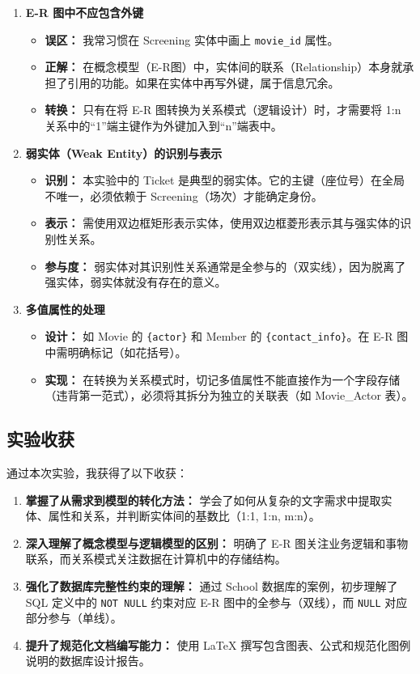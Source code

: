 \documentclass[a4paper]{article}
\begin{document}
\begin{enumerate}
    \item \textbf{E-R 图中不应包含外键}
    \begin{itemize}
        \item \textbf{误区：} 我常习惯在 Screening 实体中画上 \texttt{movie\_id} 属性。
        \item \textbf{正解：} 在概念模型（E-R图）中，实体间的联系（Relationship）本身就承担了引用的功能。如果在实体中再写外键，属于信息冗余。
        \item \textbf{转换：} 只有在将 E-R 图转换为关系模式（逻辑设计）时，才需要将 1:n 关系中的“1”端主键作为外键加入到“n”端表中。
    \end{itemize}

    \item \textbf{弱实体（Weak Entity）的识别与表示}
    \begin{itemize}
        \item \textbf{识别：} 本实验中的 Ticket 是典型的弱实体。它的主键（座位号）在全局不唯一，必须依赖于 Screening（场次）才能确定身份。
        \item \textbf{表示：} 需使用双边框矩形表示实体，使用双边框菱形表示其与强实体的识别性关系。
        \item \textbf{参与度：} 弱实体对其识别性关系通常是全参与的（双实线），因为脱离了强实体，弱实体就没有存在的意义。
    \end{itemize}

    \item \textbf{多值属性的处理}
    \begin{itemize}
        \item \textbf{设计：} 如 Movie 的 \texttt{\{actor\}} 和 Member 的 \texttt{\{contact\_info\}}。在 E-R 图中需明确标记（如花括号）。
        \item \textbf{实现：} 在转换为关系模式时，切记多值属性不能直接作为一个字段存储（违背第一范式），必须将其拆分为独立的关联表（如 Movie\_Actor 表）。
    \end{itemize}
\end{enumerate}

\subsection{实验收获}
通过本次实验，我获得了以下收获：

\begin{enumerate}
    \item \textbf{掌握了从需求到模型的转化方法：} 学会了如何从复杂的文字需求中提取实体、属性和关系，并判断实体间的基数比（1:1, 1:n, m:n）。
    \item \textbf{深入理解了概念模型与逻辑模型的区别：} 明确了 E-R 图关注业务逻辑和事物联系，而关系模式关注数据在计算机中的存储结构。
    \item \textbf{强化了数据库完整性约束的理解：} 通过 School 数据库的案例，初步理解了 SQL 定义中的 \texttt{NOT NULL} 约束对应 E-R 图中的全参与（双线），而 \texttt{NULL} 对应部分参与（单线）。
    \item \textbf{提升了规范化文档编写能力：} 使用 LaTeX 撰写包含图表、公式和规范化图例说明的数据库设计报告。
\end{enumerate}
\end{document}
